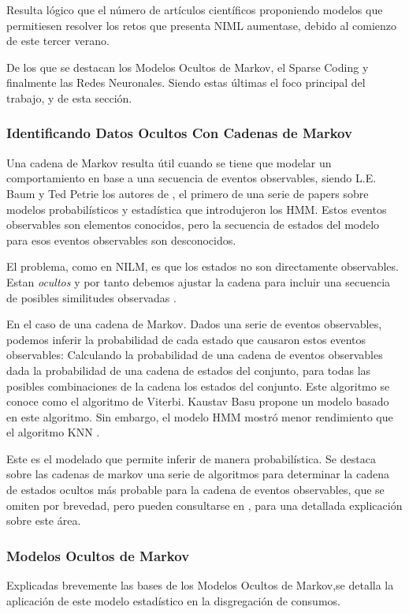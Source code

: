 Resulta lógico que el número de artículos científicos proponiendo modelos que permitiesen resolver los retos que presenta NIML aumentase, debido al comienzo de este tercer verano.


De los que se destacan los Modelos Ocultos de Markov, el Sparse Coding y finalmente las Redes Neuronales. Siendo estas últimas el foco principal del trabajo, y de esta sección. 



\subsubsection{Identificando Datos Ocultos Con Cadenas de Markov}
Una cadena de Markov resulta útil cuando se tiene que modelar un comportamiento en base a una secuencia de eventos observables, siendo L.E. Baum y Ted Petrie los autores de \autocite{introductorHMM}, el primero de una serie de papers sobre modelos probabilísticos y estadística que introdujeron los HMM.
Estos eventos observables son elementos conocidos, pero la secuencia de estados del modelo para esos eventos observables son desconocidos. 

El problema, como en NILM, es que los estados no son directamente observables. Estan \textit{ocultos} y por tanto debemos ajustar la cadena para incluir una secuencia de posibles similitudes observadas \autocite{markovStandford}. 

En el caso de una cadena de Markov. Dados una serie de eventos observables, podemos inferir la probabilidad de cada estado que causaron estos eventos observables: Calculando la probabilidad de una cadena de eventos observables dada la probabilidad de una cadena de estados del conjunto, para todas las posibles combinaciones de la cadena los estados del conjunto. 
Este algoritmo se conoce como el algoritmo de Viterbi. Kaustav Basu propone un modelo basado en este algoritmo. Sin embargo, el modelo HMM mostró menor rendimiento que el algoritmo KNN \autocite{Kaustav2015}.

Este es el modelado que permite inferir de manera probabilística.
Se destaca sobre las cadenas de markov una serie de algoritmos para determinar la cadena de estados ocultos más probable para la cadena de eventos observables, que se omiten por brevedad, pero pueden consultarse en \autocite{markovStandford}, para una detallada explicación sobre este área.

\subsubsection{Modelos Ocultos de Markov}
Explicadas brevemente las bases de los Modelos Ocultos de Markov,se detalla la aplicación de este modelo estadístico en la disgregación de consumos. 


